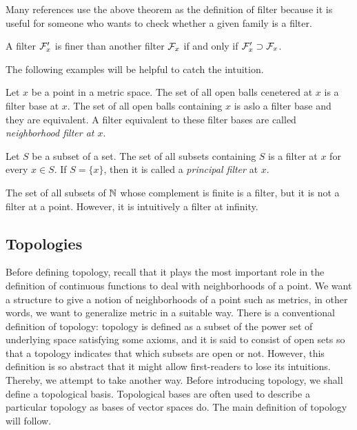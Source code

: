 \documentclass{../crs}
\begin{document}
Many references use the above theorem as the definition of filter because it is useful for someone who wants to check whether a given family is a filter.

\begin{thm}
A filter $\mathcal{F}'_x$ is finer than another filter $\mathcal{F}_x$ if and only if $\mathcal{F}'_x\supset\mathcal{F}_x$.
\end{thm}
\begin{pf}
\end{pf}

The following examples will be helpful to catch the intuition.

\begin{ex}\label{ex:neighborhood filter}
Let $x$ be a point in a metric space.
The set of all open balls cenetered at $x$ is a filter base at $x$.
The set of all open balls containing $x$ is aslo a filter base and they are equivalent.
A filter equivalent to these filter bases are called \emph{neighborhood filter at $x$}.
\end{ex}
\begin{ex}
Let $S$ be a subset of a set.
The set of all subsets containing $S$ is a filter at $x$ for every $x\in S$.
If $S=\{x\}$, then it is called a \emph{principal filter} at $x$.
\end{ex}
\begin{ex}
The set of all subsets of $\mathbb{N}$ whose complement is finite is a filter, but it is not a filter at a point.
However, it is intuitively a filter at infinity.
\end{ex}













\subsection{Topologies}
Before defining topology, recall that it plays the most important role in the definition of continuous functions to deal with neighborhoods of a point.
We want a structure to give a notion of neighborhoods of a point such as metrics, in other words, we want to generalize metric in a suitable way.
There is a conventional definition of topology: topology is defined as a subset of the power set of underlying space satisfying some axioms, and it is said to consist of open sets so that a topology indicates that which subsets are open or not.
However, this definition is so abstract that it might allow first-readers to lose its intuitions.
Thereby, we attempt to take another way.
Before introducing topology, we shall define a topological basis.
Topological bases are often used to describe a particular topology as bases of vector spaces do.
The main definition of topology will follow.
\end{document}
